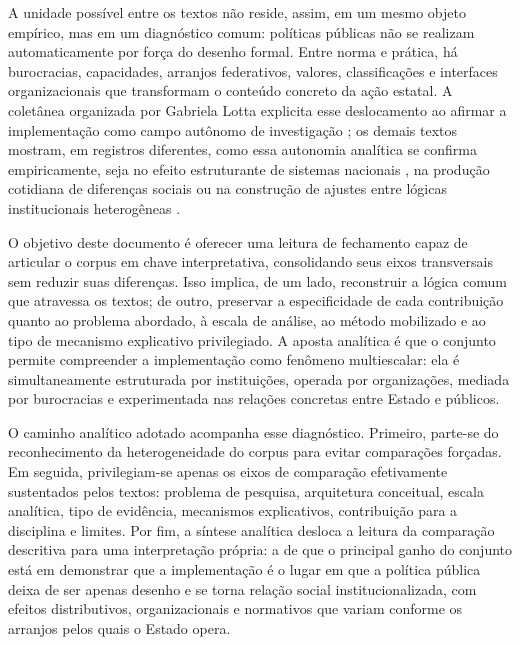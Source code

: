 \documentclass[12pt,a4paper]{article}
\begin{document}
A unidade possível entre os textos não reside, assim, em um mesmo objeto empírico, mas em um diagnóstico comum: políticas públicas não se realizam automaticamente por força do desenho formal. Entre norma e prática, há burocracias, capacidades, arranjos federativos, valores, classificações e interfaces organizacionais que transformam o conteúdo concreto da ação estatal. A coletânea organizada por Gabriela Lotta explicita esse deslocamento ao afirmar a implementação como campo autônomo de investigação \parencite{lotta2019_teorias_analises}; os demais textos mostram, em registros diferentes, como essa autonomia analítica se confirma empiricamente, seja no efeito estruturante de sistemas nacionais \parencite{bichir2020_sistemas_nacionais}, na produção cotidiana de diferenças sociais \parencite{lotta2020_categorizando_usuarios} ou na construção de ajustes entre lógicas institucionais heterogêneas \parencite{lotta2023_jesus_speaks}.

O objetivo deste documento é oferecer uma leitura de fechamento capaz de articular o corpus em chave interpretativa, consolidando seus eixos transversais sem reduzir suas diferenças. Isso implica, de um lado, reconstruir a lógica comum que atravessa os textos; de outro, preservar a especificidade de cada contribuição quanto ao problema abordado, à escala de análise, ao método mobilizado e ao tipo de mecanismo explicativo privilegiado. A aposta analítica é que o conjunto permite compreender a implementação como fenômeno multiescalar: ela é simultaneamente estruturada por instituições, operada por organizações, mediada por burocracias e experimentada nas relações concretas entre Estado e públicos.

O caminho analítico adotado acompanha esse diagnóstico. Primeiro, parte-se do reconhecimento da heterogeneidade do corpus para evitar comparações forçadas. Em seguida, privilegiam-se apenas os eixos de comparação efetivamente sustentados pelos textos: problema de pesquisa, arquitetura conceitual, escala analítica, tipo de evidência, mecanismos explicativos, contribuição para a disciplina e limites. Por fim, a síntese analítica desloca a leitura da comparação descritiva para uma interpretação própria: a de que o principal ganho do conjunto está em demonstrar que a implementação é o lugar em que a política pública deixa de ser apenas desenho e se torna relação social institucionalizada, com efeitos distributivos, organizacionais e normativos que variam conforme os arranjos pelos quais o Estado opera.
\end{document}
